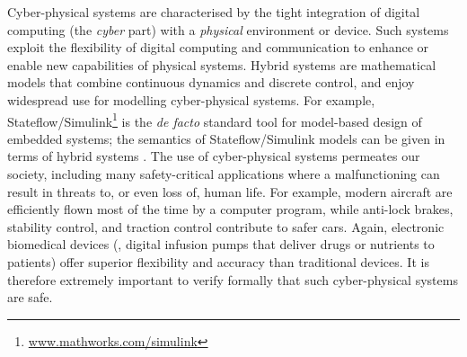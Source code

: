 
Cyber-physical systems are characterised by the tight integration of digital computing
(the {\em cyber} part) with a {\em physical} environment or device. Such systems exploit the
flexibility of digital computing and communication to enhance or enable new capabilities 
of physical systems. Hybrid systems are mathematical models that combine continuous dynamics 
and discrete control, and enjoy widespread use for modelling cyber-physical systems.
For example, Stateflow/Simulink\footnote{\url{www.mathworks.com/simulink}} is the {\em de facto} 
standard tool for model-based design of embedded systems; the semantics of Stateflow/Simulink 
models can be given in terms of hybrid systems \cite{Tiwari02,SimulinkSemantics}. The use of 
cyber-physical systems 
permeates our society, including many safety-critical applications where a malfunctioning can 
result in threats to, or even loss of, human life. For example, modern aircraft are efficiently
flown most of the time by a computer program, while anti-lock brakes, stability control, and 
traction control contribute to safer cars. Again, electronic biomedical devices (\eg, digital 
infusion pumps that deliver drugs or nutrients to patients) offer superior flexibility and 
accuracy than traditional devices. It is therefore extremely important to verify formally that 
such cyber-physical systems are safe.

